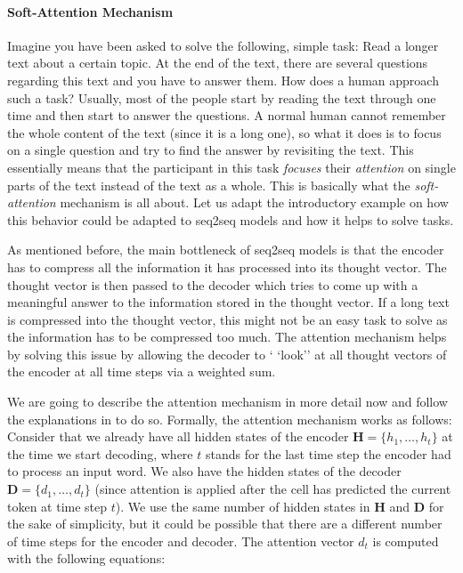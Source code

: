 \paragraph{Soft-Attention Mechanism}
Imagine you have been asked to solve the following, simple task: Read a longer text about a certain topic. At the end of the text, there are several questions regarding this text and you have to answer them. How does a human approach such a task? Usually, most of the people start by reading the text through one time and then start to answer the questions. A normal human cannot remember the whole content of the text (since it is a long one), so what it does is to focus on a single question and try to find the answer by revisiting the text. This essentially means that the participant in this task \emph{focuses} their \emph{attention} on single parts of the text instead of the text as a whole. This is basically what the \emph{soft-attention} \cite{Bahdanau:2014} mechanism is all about. Let us adapt the introductory example on how this behavior could be adapted to seq2seq models and how it helps to solve tasks.

As mentioned before, the main bottleneck of seq2seq models is that the encoder has to compress all the information it has processed into its thought vector. The thought vector is then passed to the decoder which tries to come up with a meaningful answer to the information stored in the thought vector. If a long text is compressed into the thought vector, this might not be an easy task to solve as the information has to be compressed too much. The attention mechanism helps by solving this issue by allowing the decoder to ` `look'' at all thought vectors of the encoder at all time steps via a weighted sum.

We are going to describe the attention mechanism in more detail now and follow the explanations in \cite{Vinyals:2015} to do so. Formally, the attention mechanism works as follows: Consider that we already have all hidden states of the encoder $\mathbf{H} = \{h_1,\dots,h_t\}$ at the time we start decoding, where $t$ stands for the last time step the encoder had to process an input word. We also have the hidden states of the decoder $\mathbf{D} = \{d_1,\dots,d_t\}$ (since attention is applied after the cell has predicted the current token at time step $t$). We use the same number of hidden states in $\mathbf{H}$ and $\mathbf{D}$ for the sake of simplicity, but it could be possible that there are a different number of time steps for the encoder and decoder. The attention vector $d_t$ is computed with the following equations:


